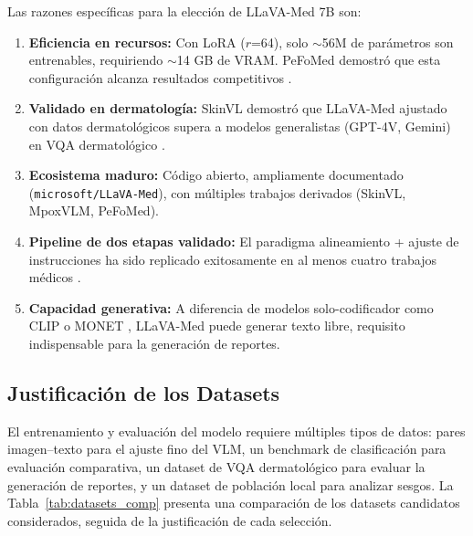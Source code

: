 \documentclass[11pt, a4paper]{article}
\begin{document}
Las razones específicas para la elección de LLaVA-Med 7B son:
\begin{enumerate}
    \item \textbf{Eficiencia en recursos:} Con LoRA ($r$=64), solo $\sim$56M de parámetros son entrenables, requiriendo $\sim$14 GB de VRAM. PeFoMed demostró que esta configuración alcanza resultados competitivos \cite{he_pefomed_2024}.
    \item \textbf{Validado en dermatología:} SkinVL demostró que LLaVA-Med ajustado con datos dermatológicos supera a modelos generalistas (GPT-4V, Gemini) en VQA dermatológico \cite{zhao_mm-skin_2025}.
    \item \textbf{Ecosistema maduro:} Código abierto, ampliamente documentado (\texttt{microsoft/LLaVA-Med}), con múltiples trabajos derivados (SkinVL, MpoxVLM, PeFoMed).
    \item \textbf{Pipeline de dos etapas validado:} El paradigma alineamiento + ajuste de instrucciones ha sido replicado exitosamente en al menos cuatro trabajos médicos \cite{li_llava-med_2023, he_pefomed_2024, zhao_mm-skin_2025, xu_mpoxvlm_2024}.
    \item \textbf{Capacidad generativa:} A diferencia de modelos solo-codificador como CLIP o MONET \cite{kim_monet_2024}, LLaVA-Med puede generar texto libre, requisito indispensable para la generación de reportes.
\end{enumerate}

\subsection{Justificación de los Datasets}

El entrenamiento y evaluación del modelo requiere múltiples tipos de datos: pares imagen--texto para el ajuste fino del VLM, un benchmark de clasificación para evaluación comparativa, un dataset de VQA dermatológico para evaluar la generación de reportes, y un dataset de población local para analizar sesgos. La Tabla~\ref{tab:datasets_comp} presenta una comparación de los datasets candidatos considerados, seguida de la justificación de cada selección.
\end{document}
